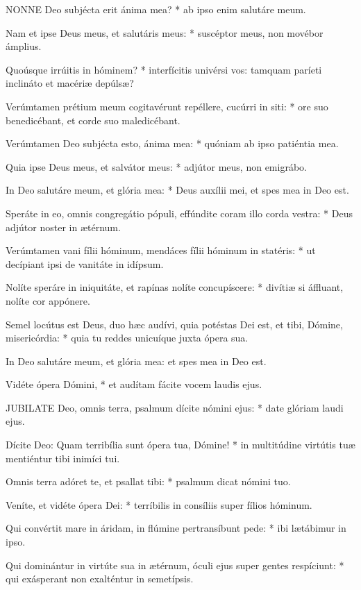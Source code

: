 
\lettrine[lines=2]{N}{ONNE} Deo subjécta erit ánima mea? * ab ipso enim salutáre meum.

Nam et ipse Deus meus, et salutáris meus: * suscéptor meus, non movébor ámplius.

Quoúsque irrúitis in hóminem? * interfícitis univérsi vos: tamquam paríeti inclináto et macériæ depúlsæ?

Verúmtamen prétium meum cogitavérunt repéllere, cucúrri in siti: * ore suo benedicébant, et corde suo maledicébant.

Verúmtamen Deo subjécta esto, ánima mea: * quóniam ab ipso patiéntia mea.

Quia ipse Deus meus, et salvátor meus: * adjútor meus, non emigrábo.

In Deo salutáre meum, et glória mea: * Deus auxílii mei, et spes mea in Deo est.

Speráte in eo, omnis congregátio pópuli, effúndite coram illo corda vestra: * Deus adjútor noster in ætérnum.

Verúmtamen vani fílii hóminum, mendáces fílii hóminum in statéris: * ut decípiant ipsi de vanitáte in idípsum.

Nolíte speráre in iniquitáte, et rapínas nolíte concupíscere: * divítiæ si áffluant, nolíte cor appónere.

Semel locútus est Deus, duo hæc audívi, quia potéstas Dei est, et tibi, Dómine, misericórdia: * quia tu reddes unicuíque juxta ópera sua.

 In Deo salutáre meum, et glória mea: et spes mea in Deo est.

 Vidéte ópera Dómini, * et audítam fácite vocem laudis ejus.


\lettrine[lines=2]{J}{UBILATE} Deo, omnis terra, psalmum dícite nómini ejus: * date glóriam laudi ejus.

Dícite Deo: Quam terribília sunt ópera tua, Dómine! * in multitúdine virtútis tuæ mentiéntur tibi inimíci tui.

Omnis terra adóret te, et psallat tibi: * psalmum dicat nómini tuo.

Veníte, et vidéte ópera Dei: * terríbilis in consíliis super fílios hóminum.

Qui convértit mare in áridam, in flúmine pertransíbunt pede: * ibi lætábimur in ipso.

Qui dominántur in virtúte sua in ætérnum, óculi ejus super gentes respíciunt: * qui exásperant non exalténtur in semetípsis.

